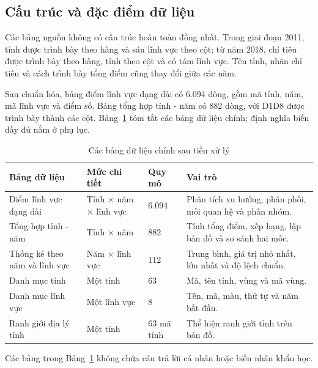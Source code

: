 \subsection{Cấu trúc và đặc điểm dữ liệu}

Các bảng nguồn không có cấu trúc hoàn toàn đồng nhất. Trong giai đoạn 2011, tỉnh được trình bày theo hàng và sáu lĩnh vực theo cột; từ năm 2018, chỉ tiêu được trình bày theo hàng, tỉnh theo cột và có tám lĩnh vực. Tên tỉnh, nhãn chỉ tiêu và cách trình bày tổng điểm cũng thay đổi giữa các năm.

Sau chuẩn hóa, bảng điểm lĩnh vực dạng dài có 6.094 dòng, gồm mã tỉnh, năm, mã lĩnh vực và điểm số. Bảng tổng hợp tỉnh - năm có 882 dòng, với D1\textendash D8 được trình bày thành các cột. Bảng~\ref{tab:processed-artifacts} tóm tắt các bảng dữ liệu chính; định nghĩa biến đầy đủ nằm ở phụ lục.

\begin{table}[H]
    \centering
    \caption{Các bảng dữ liệu chính sau tiền xử lý}
    \label{tab:processed-artifacts}
    \small
    \begin{tabularx}{\textwidth}{@{}p{}p{}p{}X@{}}
        \toprule
        \textbf{Bảng dữ liệu} & \textbf{Mức chi tiết} & \textbf{Quy mô} & \textbf{Vai trò} \\
        \midrule
        Điểm lĩnh vực dạng dài & Tỉnh $\times$ năm $\times$ lĩnh vực & 6.094 & Phân tích xu hướng, phân phối, mối quan hệ và phân nhóm. \\
        Tổng hợp tỉnh - năm & Tỉnh $\times$ năm & 882 & Tính tổng điểm, xếp hạng, lập bản đồ và so sánh hai mốc. \\
        Thống kê theo năm và lĩnh vực & Năm $\times$ lĩnh vực & 112 & Trung bình, giá trị nhỏ nhất, lớn nhất và độ lệch chuẩn. \\
        Danh mục tỉnh & Một tỉnh & 63 & Mã, tên tỉnh, vùng và mã vùng. \\
        Danh mục lĩnh vực & Một lĩnh vực & 8 & Tên, mã, màu, thứ tự và năm bắt đầu. \\
        Ranh giới địa lý tỉnh & Một tỉnh & 63 mã tỉnh & Thể hiện ranh giới tỉnh trên bản đồ. \\
        \bottomrule
    \end{tabularx}
\end{table}

Các bảng trong Bảng~\ref{tab:processed-artifacts} không chứa câu trả lời cá nhân hoặc biến nhân khẩu học.

